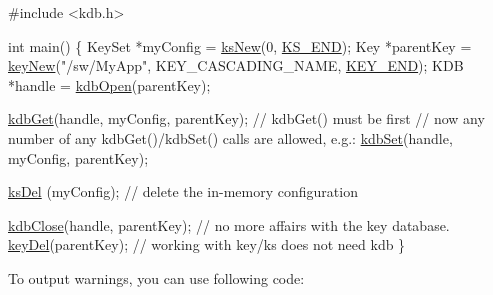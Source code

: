 \begin{DoxyCodeInclude}

\textcolor{preprocessor}{#include <kdb.h>}

\textcolor{keywordtype}{int} main()
\{
        KeySet *myConfig = \hyperlink{group__keyset_ga671e1aaee3ae9dc13b4834a4ddbd2c3c}{ksNew}(0, \hyperlink{kdbenum_8c_a7a28fce3773b2c873c94ac80b8b4cd54}{KS\_END});
        Key *parentKey = \hyperlink{group__key_gad23c65b44bf48d773759e1f9a4d43b89}{keyNew}(\textcolor{stringliteral}{"/sw/MyApp"}, KEY\_CASCADING\_NAME, \hyperlink{group__key_gga91fb3178848bd682000958089abbaf40aa8adb6fcb92dec58fb19410eacfdd403}{KEY\_END});
        KDB *handle = \hyperlink{group__kdb_ga6808defe5870f328dd17910aacbdc6ca}{kdbOpen}(parentKey);

        \hyperlink{group__kdb_ga28e385fd9cb7ccfe0b2f1ed2f62453a1}{kdbGet}(handle, myConfig, parentKey); \textcolor{comment}{// kdbGet() must be first}
        \textcolor{comment}{// now any number of any kdbGet()/kdbSet() calls are allowed, e.g.:}
        \hyperlink{group__kdb_ga11436b058408f83d303ca5e996832bcf}{kdbSet}(handle, myConfig, parentKey);

        \hyperlink{group__keyset_ga27e5c16473b02a422238c8d970db7ac8}{ksDel} (myConfig); \textcolor{comment}{// delete the in-memory configuration}

        \hyperlink{group__kdb_gadb54dc9fda17ee07deb9444df745c96f}{kdbClose}(handle, parentKey); \textcolor{comment}{// no more affairs with the key database.}
        \hyperlink{group__key_ga3df95bbc2494e3e6703ece5639be5bb1}{keyDel}(parentKey); \textcolor{comment}{// working with key/ks does not need kdb}
\}
\end{DoxyCodeInclude}


To output warnings, you can use following code\+:


